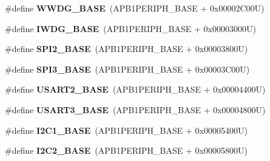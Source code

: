 \begin{DoxyCompactItemize}
\item 
\hypertarget{group___peripheral__memory__map_ga9a5bf4728ab93dea5b569f5b972cbe62}{\#define {\bfseries W\-W\-D\-G\-\_\-\-B\-A\-S\-E}~(A\-P\-B1\-P\-E\-R\-I\-P\-H\-\_\-\-B\-A\-S\-E + 0x00002\-C00\-U)}\label{group___peripheral__memory__map_ga9a5bf4728ab93dea5b569f5b972cbe62}

\item 
\hypertarget{group___peripheral__memory__map_ga8543ee4997296af5536b007cd4748f55}{\#define {\bfseries I\-W\-D\-G\-\_\-\-B\-A\-S\-E}~(A\-P\-B1\-P\-E\-R\-I\-P\-H\-\_\-\-B\-A\-S\-E + 0x00003000\-U)}\label{group___peripheral__memory__map_ga8543ee4997296af5536b007cd4748f55}

\item 
\hypertarget{group___peripheral__memory__map_gac3e357b4c25106ed375fb1affab6bb86}{\#define {\bfseries S\-P\-I2\-\_\-\-B\-A\-S\-E}~(A\-P\-B1\-P\-E\-R\-I\-P\-H\-\_\-\-B\-A\-S\-E + 0x00003800\-U)}\label{group___peripheral__memory__map_gac3e357b4c25106ed375fb1affab6bb86}

\item 
\hypertarget{group___peripheral__memory__map_gae634fe8faa6922690e90fbec2fc86162}{\#define {\bfseries S\-P\-I3\-\_\-\-B\-A\-S\-E}~(A\-P\-B1\-P\-E\-R\-I\-P\-H\-\_\-\-B\-A\-S\-E + 0x00003\-C00\-U)}\label{group___peripheral__memory__map_gae634fe8faa6922690e90fbec2fc86162}

\item 
\hypertarget{group___peripheral__memory__map_gade83162a04bca0b15b39018a8e8ec090}{\#define {\bfseries U\-S\-A\-R\-T2\-\_\-\-B\-A\-S\-E}~(A\-P\-B1\-P\-E\-R\-I\-P\-H\-\_\-\-B\-A\-S\-E + 0x00004400\-U)}\label{group___peripheral__memory__map_gade83162a04bca0b15b39018a8e8ec090}

\item 
\hypertarget{group___peripheral__memory__map_gabe0d6539ac0026d598274ee7f45b0251}{\#define {\bfseries U\-S\-A\-R\-T3\-\_\-\-B\-A\-S\-E}~(A\-P\-B1\-P\-E\-R\-I\-P\-H\-\_\-\-B\-A\-S\-E + 0x00004800\-U)}\label{group___peripheral__memory__map_gabe0d6539ac0026d598274ee7f45b0251}

\item 
\hypertarget{group___peripheral__memory__map_gacd72dbffb1738ca87c838545c4eb85a3}{\#define {\bfseries I2\-C1\-\_\-\-B\-A\-S\-E}~(A\-P\-B1\-P\-E\-R\-I\-P\-H\-\_\-\-B\-A\-S\-E + 0x00005400\-U)}\label{group___peripheral__memory__map_gacd72dbffb1738ca87c838545c4eb85a3}

\item 
\hypertarget{group___peripheral__memory__map_ga04bda70f25c795fb79f163b633ad4a5d}{\#define {\bfseries I2\-C2\-\_\-\-B\-A\-S\-E}~(A\-P\-B1\-P\-E\-R\-I\-P\-H\-\_\-\-B\-A\-S\-E + 0x00005800\-U)}\label{group___peripheral__memory__map_ga04bda70f25c795fb79f163b633ad4a5d}


\end{DoxyCompactItemize}
